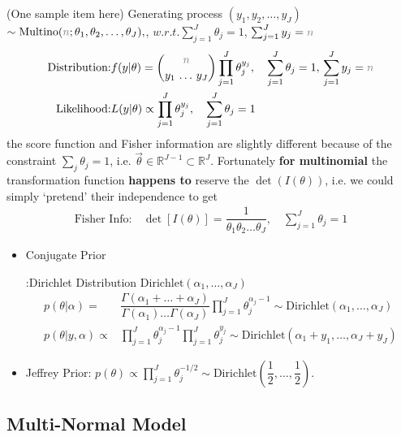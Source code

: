 (One sample item here) Generating process $ (y_1,y_2,\ldots,y_J) $ $ \sim \mathrm{Multino}(\fixed{n};\theta _1,\theta _2,\ldots,\theta _J)  ,$, $w.r.t. \sum_{j=1}^J \theta _j = 1$, $ \sum_{j=1}^Jy_j=\fixed{n} $ 
\begin{align}
    \text{Distribution:}&f(y|\theta  )=\binom{\fixed{n}}{y _1\,\ldots\,y _J}\prod_{j=1}^J \theta _j^{y_j},\quad \sum_{j=1}^J\theta _j=1,\,\sum_{j=1}^Jy_j=\fixed{n}\\
    \text{Likelihood:}&L(y|\theta )\propto\prod_{j=1}^J \theta _j^{y_j},\quad \sum_{j=1}^J\theta _j=1
\end{align}
    the score function and Fisher information are slightly different because of the constraint $ \sum_{j}\theta _j=1 $, i.e. $ \vec{\theta }\in \mathbb{R}^{J-1}\subset \mathbb{R}^J $. Fortunately \textbf{for multinomial} the transformation function \textbf{happens to} reserve the $\det(I(\theta ))$, i.e. we could simply `pretend' their independence to get 
    \begin{align}
        \text{Fisher Info:}&\,\det\left[ I(\theta )\right]=\dfrac{1}{\theta _1\theta _2\ldots \theta _J},\quad \sum_{j=1}^J\theta _j=1
    \end{align}


    
\begin{itemize}[topsep=2pt,itemsep=0pt]
    \item \hypertarget{MultinomConjugate}{Conjugate Prior}:Dirichlet Distribution $ \mathrm{ Dirichlet }(\alpha _1,\ldots,\alpha _J)  $
    \begin{align}
        p(\theta |\alpha )=&\dfrac{ \Gamma (\alpha _1+\ldots+\alpha _J) }{ \Gamma (\alpha _1)\ldots\Gamma (\alpha _J) }\prod_{j=1}^J\theta _j^{\alpha _j-1}\sim \mathrm{ Dirichlet }(\alpha _1,\ldots,\alpha _J)    \\
        p(\theta |y,\alpha )\propto&\prod_{j=1}^J\theta _j^{\alpha _j-1}\prod_{j=1}^J\theta _j^{y_j}\sim \mathrm{Dirichlet }(\alpha _1+y_1,\ldots,\alpha _J+y_J)
    \end{align}
    
    
    \item Jeffrey Prior: $ p(\theta  )\propto \prod_{j=1}^J\theta _j^{-1/2}\sim \mathrm{Dirichlet }(\dfrac{ 1 }{ 2 },\ldots,\dfrac{ 1 }{ 2 }  ) $.
\end{itemize}




\subsection{Multi-Normal Model}\label{SubSubSectionBayesianMultinormal}


